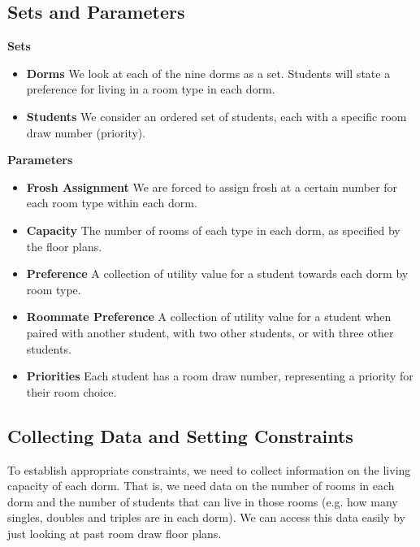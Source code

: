 \documentclass[12pt]{article}
\begin{document}
    \subsection*{Sets and Parameters}
    \textbf{Sets}
    \begin{itemize}
        \item \textbf{Dorms} We look at each of the nine dorms as a set. Students will state a preference for living in a room type in each dorm. 
        \item \textbf{Students} We consider an ordered set of students, each with a specific room draw number (priority).
    \end{itemize}
    \textbf{Parameters}
    \begin{itemize}
        \item \textbf{Frosh Assignment} We are forced to assign frosh at a certain number for each room type within each dorm.
        \item \textbf{Capacity} The number of rooms of each type in each dorm, as specified by the floor plans. 
        \item \textbf{Preference} A collection of utility value for a student towards each dorm by room type. 
        \item \textbf{Roommate Preference} A collection of utility value for a student when paired with another student, with two other students, or with three other students.
        \item \textbf{Priorities} Each student has a room draw number, representing a priority for their room choice. 
    \end{itemize}
    
    \subsection*{Collecting Data and Setting Constraints}
    To establish appropriate constraints, we need to collect information on the living capacity of each dorm. That is, we need data on the number of rooms in each dorm and the number of students that can live in those rooms (e.g. how many singles, doubles and triples are in each dorm). We can access this data easily by just looking at past room draw floor plans. 
    
    
\end{document}
